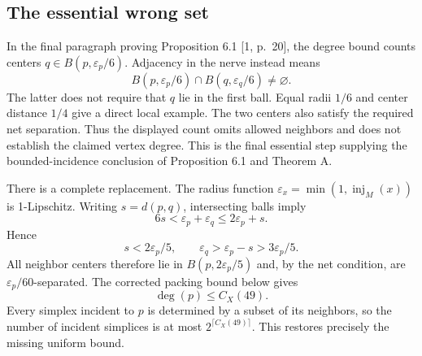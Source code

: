 \documentclass[10pt]{article}
\begin{document}
\subsection*{The essential wrong set}
In the final paragraph proving Proposition 6.1 [1, p. 20], the degree bound counts centers \(q\in B(p,\varepsilon_p/6)\). Adjacency in the nerve instead means \[B(p,\varepsilon_p/6)\cap B(q,\varepsilon_q/6)\ne\varnothing.\] The latter does not require that \(q\) lie in the first ball. Equal radii \(1/6\) and center distance \(1/4\) give a direct local example. The two centers also satisfy the required net separation. Thus the displayed count omits allowed neighbors and does not establish the claimed vertex degree. This is the final essential step supplying the bounded-incidence conclusion of Proposition 6.1 and Theorem A.\par
There is a complete replacement. The radius function \(\varepsilon_x=\min(1,\operatorname{inj}_M(x))\) is 1-Lipschitz. Writing \(s=d(p,q)\), intersecting balls imply \[6s<\varepsilon_p+\varepsilon_q
 \le2\varepsilon_p+s.\] Hence \[s<2\varepsilon_p/5,\qquad
 \varepsilon_q>\varepsilon_p-s>3\varepsilon_p/5.
 \tag{7.1}\] All neighbor centers therefore lie in \(B(p,2\varepsilon_p/5)\) and, by the net condition, are \(\varepsilon_p/60\)-separated. The corrected packing bound below gives \[\deg(p)\le C_X(49).\] Every simplex incident to \(p\) is determined by a subset of its neighbors, so the number of incident simplices is at most \(2^{\lceil C_X(49)\rceil}\). This restores precisely the missing uniform bound.\par
\end{document}
